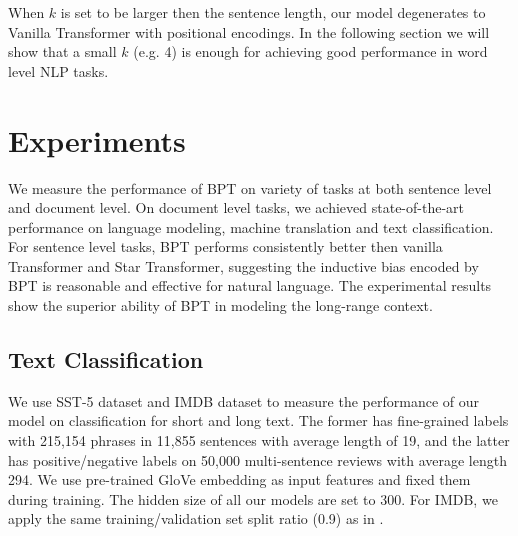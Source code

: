 \documentclass[11pt,a4paper]{article}
\begin{document}
When $k$ is set to be larger then the sentence length, our model degenerates to Vanilla Transformer with positional encodings. In the following section we will show that a small $k$ (e.g. 4) is enough for achieving good performance in word level NLP tasks.

\section{Experiments}





We measure the performance of BPT on variety of tasks at both sentence level and document level. On document level tasks, we achieved state-of-the-art performance on language modeling, machine translation and text classification. For sentence level tasks, BPT performs consistently better then vanilla Transformer and Star Transformer, suggesting the inductive bias encoded by BPT is reasonable and effective for natural language.
The experimental results show the superior ability of BPT in modeling the long-range context.

\subsection{Text Classification}

We use SST-5 dataset \citep{socher2013recursive} and IMDB dataset \citep{maas2011learning} to measure the performance of our model on classification for short and long text.  The former has fine-grained labels with 215,154 phrases in 11,855 sentences with average length of 19, and the latter has positive/negative labels on 50,000 multi-sentence reviews with average length 294.
We use pre-trained GloVe embedding \citep{pennington2014glove} as input features and fixed them during training.
The hidden size of all our models are set to 300.
For IMDB, we apply the same training/validation set split ratio (0.9) as in \citet{mccann2017learned}.
\end{document}
